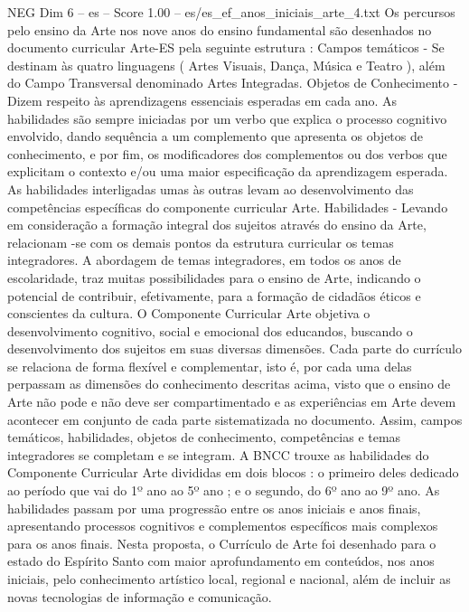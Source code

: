 \begin{textsample}{NEG Dim 6 – es – Score 1.00 – es/es\_ef\_anos\_iniciais\_arte\_4.txt}  \label{ex:f6_neg_143}
Os percursos pelo ensino da Arte nos nove anos do ensino fundamental são desenhados no documento curricular Arte-ES pela seguinte estrutura : Campos temáticos - Se destinam às quatro linguagens ( Artes Visuais, Dança, Música e Teatro ), além do Campo Transversal denominado Artes Integradas.
Objetos de Conhecimento - Dizem respeito às aprendizagens essenciais esperadas em cada ano.
As habilidades são sempre iniciadas por um verbo que explica o processo cognitivo envolvido, dando sequência a um complemento que apresenta os objetos de conhecimento, e por fim, os modificadores dos complementos ou dos verbos que explicitam o contexto e/ou uma maior especificação da aprendizagem esperada.
As habilidades interligadas umas às outras levam ao desenvolvimento das competências específicas do componente curricular Arte.
Habilidades - Levando em consideração a formação integral dos sujeitos através do ensino da Arte, relacionam -se com os demais pontos da estrutura curricular os temas integradores.
A abordagem de temas integradores, em todos os anos de escolaridade, traz muitas possibilidades para o ensino de Arte, indicando o potencial de contribuir, efetivamente, para a formação de cidadãos éticos e conscientes da cultura.
O Componente Curricular Arte objetiva o desenvolvimento cognitivo, social e emocional dos educandos, buscando o desenvolvimento dos sujeitos em suas diversas dimensões.
Cada parte do currículo se relaciona de forma flexível e complementar, isto é, por cada uma delas perpassam as dimensões do conhecimento descritas acima, visto que o ensino de Arte não pode e não deve ser compartimentado e as experiências em Arte devem acontecer em conjunto de cada parte sistematizada no documento.
Assim, campos temáticos, habilidades, objetos de conhecimento, competências e temas integradores se completam e se integram.
A BNCC trouxe as habilidades do Componente Curricular Arte divididas em dois blocos : o primeiro deles dedicado ao período que vai do 1º ano ao 5º ano ; e o segundo, do 6º ano ao 9º ano.
As habilidades passam por uma progressão entre os anos iniciais e anos finais, apresentando processos cognitivos e complementos específicos mais complexos para os anos finais.
Nesta proposta, o Currículo de Arte foi desenhado para o estado do Espírito Santo com maior aprofundamento em conteúdos, nos anos iniciais, pelo conhecimento artístico local, regional e nacional, além de incluir as novas tecnologias de informação e comunicação.

\end{textsample}
